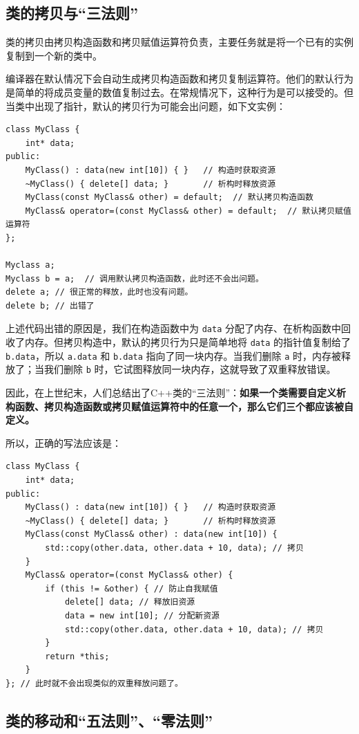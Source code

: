 \subsection{类的拷贝与“三法则”}

类的拷贝由拷贝构造函数和拷贝赋值运算符负责，主要任务就是将一个已有的实例复制到一个新的类中。

编译器在默认情况下会自动生成拷贝构造函数和拷贝复制运算符。他们的默认行为是简单的将成员变量的数值复制过去。在常规情况下，这种行为是可以接受的。但当类中出现了指针，默认的拷贝行为可能会出问题，如下文实例：
\begin{verbatim}
class MyClass {
    int* data;
public:
    MyClass() : data(new int[10]) { }   // 构造时获取资源
    ~MyClass() { delete[] data; }       // 析构时释放资源
    MyClass(const MyClass& other) = default;  // 默认拷贝构造函数
    MyClass& operator=(const MyClass& other) = default;  // 默认拷贝赋值运算符
};

Myclass a;
Myclass b = a;  // 调用默认拷贝构造函数，此时还不会出问题。
delete a; // 很正常的释放，此时也没有问题。
delete b; // 出错了
\end{verbatim}

上述代码出错的原因是，我们在构造函数中为 \verb|data| 分配了内存、在析构函数中回收了内存。但拷贝构造中，默认的拷贝行为只是简单地将 \verb|data| 的指针值复制给了 \verb|b.data|，所以 \verb|a.data| 和 \verb|b.data| 指向了同一块内存。当我们删除 \verb|a| 时，内存被释放了；当我们删除 \verb|b| 时，它试图释放同一块内存，这就导致了双重释放错误。

因此，在上世纪末，人们总结出了C++类的“三法则”：\textbf{如果一个类需要自定义析构函数、拷贝构造函数或拷贝赋值运算符中的任意一个，那么它们三个都应该被自定义。} 

所以，正确的写法应该是：
\begin{verbatim}
class MyClass {
    int* data;
public:
    MyClass() : data(new int[10]) { }   // 构造时获取资源
    ~MyClass() { delete[] data; }       // 析构时释放资源
    MyClass(const MyClass& other) : data(new int[10]) {
        std::copy(other.data, other.data + 10, data); // 拷贝
    }
    MyClass& operator=(const MyClass& other) {
        if (this != &other) { // 防止自我赋值
            delete[] data; // 释放旧资源
            data = new int[10]; // 分配新资源
            std::copy(other.data, other.data + 10, data); // 拷贝
        }
        return *this;
    }
}; // 此时就不会出现类似的双重释放问题了。
\end{verbatim}

\subsection{类的移动和“五法则”、“零法则”}

